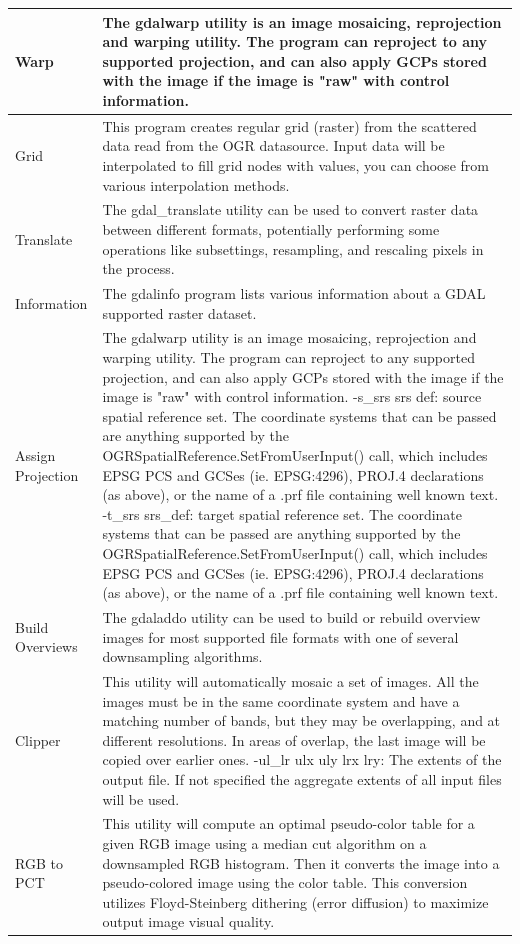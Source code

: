 {\begin{longtable}{|p{3cm}|p{13cm}|}
\hline Warp & The gdalwarp utility is an image mosaicing, reprojection and warping utility. The program can reproject to any supported projection, and can also apply GCPs stored with the image if the image is "raw" with control information. \\
\hline Grid & This program creates regular grid (raster) from the scattered data read from the OGR datasource. Input data will be interpolated to fill grid nodes with values, you can choose from various interpolation methods.\\
\hline Translate & The gdal\_translate utility can be used to convert raster data between different formats, potentially performing some operations like subsettings, resampling, and rescaling pixels in the process.\\
\hline Information & The gdalinfo program lists various information about a GDAL supported raster dataset. \\
\hline Assign Projection &  The gdalwarp utility is an image mosaicing, reprojection and warping utility. The program can reproject to any supported projection, and can also apply GCPs stored with the image if the image is "raw" with control information.
-s\_srs srs def:
source spatial reference set. The coordinate systems that can be passed are anything supported by the OGRSpatialReference.SetFromUserInput() call, which includes EPSG PCS and GCSes (ie. EPSG:4296), PROJ.4 declarations (as above), or the name of a .prf file containing well known text. 
-t\_srs srs\_def:
target spatial reference set. The coordinate systems that can be passed are anything supported by the OGRSpatialReference.SetFromUserInput() call, which includes EPSG PCS and GCSes (ie. EPSG:4296), PROJ.4 declarations (as above), or the name of a .prf file containing well known text. \\
\hline Build Overviews &  The gdaladdo utility can be used to build or rebuild overview images for most supported file formats with one of several downsampling algorithms.\\
\hline Clipper & This utility will automatically mosaic a set of images. All the images must be in the same coordinate system and have a matching number of bands, but they may be overlapping, and at different resolutions. In areas of overlap, the last image will be copied over earlier ones. 
-ul\_lr ulx uly lrx lry:
The extents of the output file. If not specified the aggregate extents of all input files will be used. \\
\hline RGB to PCT &  This utility will compute an optimal pseudo-color table for a given RGB image using a median cut algorithm on a downsampled RGB histogram. Then it converts the image into a pseudo-colored image using the color table. This conversion utilizes Floyd-Steinberg dithering (error diffusion) to maximize output image visual quality. \\

\end{longtable}}
